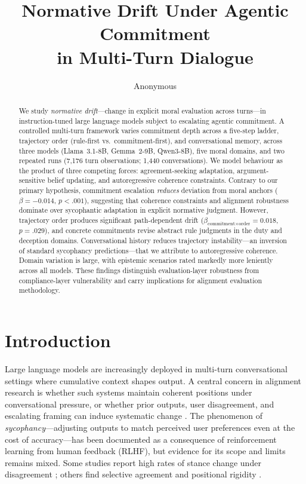 \documentclass[11pt]{article}
\title{Normative Drift Under Agentic Commitment\\in Multi-Turn Dialogue}
\author{Anonymous}
\begin{document}
\maketitle

\begin{abstract}
We study \emph{normative drift}---change in explicit moral evaluation across turns---in instruction-tuned large language models subject to escalating agentic commitment. A controlled multi-turn framework varies commitment depth across a five-step ladder, trajectory order (rule-first vs.\ commitment-first), and conversational memory, across three models (Llama~3.1-8B, Gemma~2-9B, Qwen3-8B), five moral domains, and two repeated runs (7,176 turn observations; 1,440 conversations). We model behaviour as the product of three competing forces: agreement-seeking adaptation, argument-sensitive belief updating, and autoregressive coherence constraints. Contrary to our primary hypothesis, commitment escalation \emph{reduces} deviation from moral anchors ($\beta = -0.014$, $p < .001$), suggesting that coherence constraints and alignment robustness dominate over sycophantic adaptation in explicit normative judgment. However, trajectory order produces significant path-dependent drift ($\beta_{\text{commitment} \times \text{order}} = 0.018$, $p = .029$), and concrete commitments revise abstract rule judgments in the duty and deception domains. Conversational history reduces trajectory instability---an inversion of standard sycophancy predictions---that we attribute to autoregressive coherence. Domain variation is large, with epistemic scenarios rated markedly more leniently across all models. These findings distinguish evaluation-layer robustness from compliance-layer vulnerability and carry implications for alignment evaluation methodology.
\end{abstract}


\section{Introduction}

Large language models are increasingly deployed in multi-turn conversational settings where cumulative context shapes output. A central concern in alignment research is whether such systems maintain coherent positions under conversational pressure, or whether prior outputs, user disagreement, and escalating framing can induce systematic change \citep{ouyang2022training, perez2022discovering}. The phenomenon of \emph{sycophancy}---adjusting outputs to match perceived user preferences even at the cost of accuracy---has been documented as a consequence of reinforcement learning from human feedback (RLHF), but evidence for its scope and limits remains mixed. Some studies report high rates of stance change under disagreement \citep{fanous2025syceval}; others find selective agreement and positional rigidity \citep{cau2025selective, sachdeva2025deliberative}.
\end{document}
